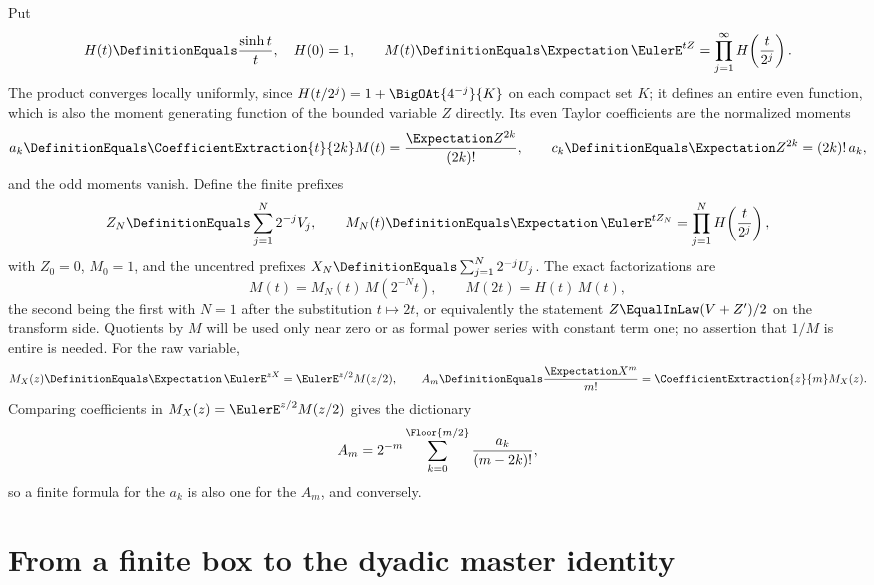 \documentclass[11pt,oneside]{article}
\theoremstyle{plain}
\theoremstyle{definition}
\theoremstyle{remark}
\newcommand{\E}{\Expectation}
\newcommand{\coeff}[2]{\CoefficientExtraction{#1}{#2}}
\begin{document}
Put
\begin{equation}
 H(t)\DefinitionEquals\frac{\sinh t}{t},\quad H(0)=1,\qquad
 M(t)\DefinitionEquals\E\,\EulerE^{tZ}=\prod_{j=1}^{\infty}H\!\left(\frac{t}{2^{j}}\right).
 \label{rf:eq:setup-M}
\end{equation}
The product converges locally uniformly, since $H(t/2^{j})=1+\BigOAt{4^{-j}}{K}$
on each compact set $K$; it defines an entire even function, which is also
the moment generating function of the bounded variable $Z$ directly.  Its
even Taylor coefficients are the normalized moments
\begin{equation}
 a_{k}\DefinitionEquals\coeff{t}{2k}M(t)=\frac{\E Z^{2k}}{(2k)!},\qquad
 c_{k}\DefinitionEquals\E Z^{2k}=(2k)!\,a_{k},
 \label{rf:eq:setup-a-c}
\end{equation}
and the odd moments vanish.  Define the finite prefixes
\begin{equation}
 Z_{N}\DefinitionEquals\sum_{j=1}^{N}2^{-j}V_{j},\qquad
 M_{N}(t)\DefinitionEquals\E\,\EulerE^{tZ_{N}}=\prod_{j=1}^{N}H\!\left(\frac{t}{2^{j}}\right),
 \label{rf:eq:setup-prefix}
\end{equation}
with $Z_{0}=0$, $M_{0}=1$, and the uncentred prefixes
$X_{N}\DefinitionEquals\sum_{j=1}^{N}2^{-j}U_{j}$.  The exact
factorizations are
\begin{equation}
 M(t)=M_{N}(t)\,M(2^{-N}t),\qquad M(2t)=H(t)\,M(t),
 \label{rf:eq:setup-tail-M}
\end{equation}
the second being the first with $N=1$ after the substitution $t\mapsto2t$,
or equivalently the statement $Z\EqualInLaw(V+Z')/2$ on the transform side.
Quotients by $M$ will be used only near zero or as formal power series with
constant term one; no assertion that $1/M$ is entire is needed.  For the
raw variable,
\begin{equation}
 M_{X}(z)\DefinitionEquals\E\,\EulerE^{zX}=\EulerE^{z/2}M(z/2),\qquad
 A_{m}\DefinitionEquals\frac{\E X^{m}}{m!}=\coeff{z}{m}M_{X}(z).
 \label{rf:eq:setup-raw}
\end{equation}
Comparing coefficients in $M_{X}(z)=\EulerE^{z/2}M(z/2)$ gives the dictionary
\begin{equation}
 A_{m}=2^{-m}\sum_{k=0}^{\Floor{m/2}}\frac{a_{k}}{(m-2k)!},
 \label{rf:eq:setup-raw-centred}
\end{equation}
so a finite formula for the $a_{k}$ is also one for the $A_{m}$, and
conversely.

\section{From a finite box to the dyadic master identity}
\label{rf:sec:master}
\end{document}
